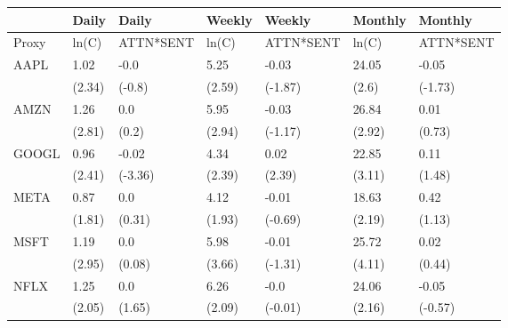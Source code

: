\begin{tabular}{lllllll}
\toprule
{} &   Daily &      Daily &  Weekly &     Weekly & Monthly &    Monthly \\
\midrule
Proxy &   ln(C) &  ATTN*SENT &   ln(C) &  ATTN*SENT &   ln(C) &  ATTN*SENT \\
AAPL  &    1.02 &       -0.0 &    5.25 &      -0.03 &   24.05 &      -0.05 \\
      &  (2.34) &     (-0.8) &  (2.59) &    (-1.87) &   (2.6) &    (-1.73) \\
AMZN  &    1.26 &        0.0 &    5.95 &      -0.03 &   26.84 &       0.01 \\
      &  (2.81) &      (0.2) &  (2.94) &    (-1.17) &  (2.92) &     (0.73) \\
GOOGL &    0.96 &      -0.02 &    4.34 &       0.02 &   22.85 &       0.11 \\
      &  (2.41) &    (-3.36) &  (2.39) &     (2.39) &  (3.11) &     (1.48) \\
META  &    0.87 &        0.0 &    4.12 &      -0.01 &   18.63 &       0.42 \\
      &  (1.81) &     (0.31) &  (1.93) &    (-0.69) &  (2.19) &     (1.13) \\
MSFT  &    1.19 &        0.0 &    5.98 &      -0.01 &   25.72 &       0.02 \\
      &  (2.95) &     (0.08) &  (3.66) &    (-1.31) &  (4.11) &     (0.44) \\
NFLX  &    1.25 &        0.0 &    6.26 &       -0.0 &   24.06 &      -0.05 \\
      &  (2.05) &     (1.65) &  (2.09) &    (-0.01) &  (2.16) &    (-0.57) \\
\bottomrule
\end{tabular}
